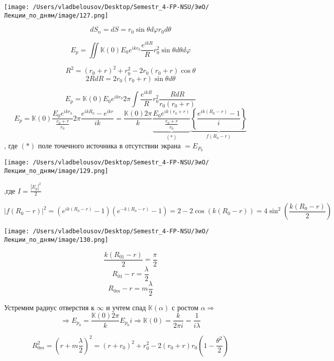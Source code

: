 \documentclass[12pt, a4paper]{report}
\begin{document}
\begin{center}
    \texttt{[image: /Users/vladbelousov/Desktop/Semestr\_4-FP-NSU/ЭиО/Лекции\_по\_дням/image/127.png]}
\end{center}

\[ d S_n = d S = r_0 \sin  \theta d \varphi r_0 d \theta \] 

\[ E_p = \iint \mathbb{K}(0 ) E_0 e^{ i k r_0} \frac{e^{i k R } } {R } r_0 ^2 \sin  \theta d \theta d \varphi     \] 

\[ R ^2 = (r_0 +r   ) ^2 + r_0 ^2 - 2 r_0 (r_0 + r  ) \cos  \theta\] 
\[ 2 R d R = 2 r_0 (r_0 + r ) \sin  \theta d \theta  \] 

\[ E_p = \mathbb{K} (0 ) E_0 e^{i k r_0} 2 \pi \int \frac{ e^{i k R } }{R } r_0 ^2 \frac{ R dR }{r_0 (r_0 +r)}    \] 
\[ E_p = \mathbb{K} (0 ) \frac{ E_0 e^{ i k r_0 } }{\displaystyle \frac{r_0 + r }{r_0} }  2 \pi \frac{ e^{i k R_0 } - e^{ i k r} }{i k  } = \frac{\mathbb{K} (0 )2 \pi }{k }\underbrace{ \frac{ E_0 e^{ i k (r_0 +r )} }{\displaystyle  \frac{r_0 +r }{r_0} }}_{(*)} \underbrace{\left\{  \frac{e^{ i k (R_0 -r )} -1 }{i} \right\} }_{f(R_0 -r)}  \] 
, где \( (*) \) поле точечного источника в отсутствии экрана \( = E_{P_0}  \) 

\begin{center}
    \texttt{[image: /Users/vladbelousov/Desktop/Semestr\_4-FP-NSU/ЭиО/Лекции\_по\_дням/image/129.png]}
\end{center}
,где \( \displaystyle  I = \frac{|E_p| ^2 }{2}  \) 

\[ |f(R_0 - r)| ^2  = (e ^{ i k (R_0 - r)} -1)(e^{ - k (R_0 - r)} - 1)= 2 -2 \cos (k(R_0 - r)) = 4 \sin ^2 \left( \frac{k (R_0 -r)}{2}  \right)\] 

\begin{center}
    \texttt{[image: /Users/vladbelousov/Desktop/Semestr\_4-FP-NSU/ЭиО/Лекции\_по\_дням/image/130.png]}
\end{center}

\[ \frac{k (R_{01} - r)}{2} = \frac{\pi}{2 }   \] 
\[ R_{01} -r = \frac{\lambda}{2 }  \] 
\[ R_{0m} - r = m \frac{\lambda}{2}   \] 

Устремим радиус  отверстия к \( \infty  \) и учтем спад \( \mathbb{K} (\alpha) \) с ростом \( \alpha  \Rightarrow\) 
\[ \Rightarrow E_{p_0} = \frac{\mathbb{K} (0 ) 2 \pi }{k } E_{p_ 0} i \Rightarrow \mathbb{K}(0 ) = \frac{k}{2 \pi i } = \frac{1}{i \lambda }      \] 

\[ R_{0 m }  ^2  =\left( r + m \frac{\lambda}{2 }  \right) ^2 = (r +r_0 ) ^2 + r_0 ^2 - 2 (r_0 + r )r_0 \left( 1 - \frac{\theta ^2 }{2}  \right)  \] 
\end{document}
